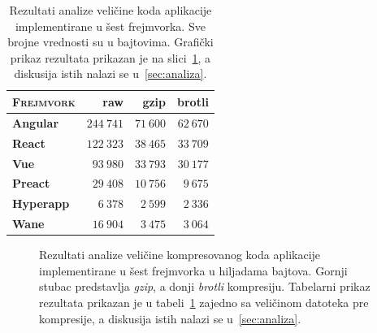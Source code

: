 \begin{table}[p]
  \centering
  \begin{tabularx}{0.66\textwidth}{Xrrr}
    \toprule 
    \textsc{Frejmvork} & {raw} & {gzip} & {brotli} \\
    \midrule
    \textbf{Angular} & $244~741$ & $71~600$ & $62~670$ \\
    \textbf{React}   & $122~323$ & $38~465$ & $33~709$ \\
    \textbf{Vue}     &  $93~980$ & $33~793$ & $30~177$ \\
    \textbf{Preact}  &  $29~408$ & $10~756$ &  $9~675$ \\ 
    \textbf{Hyperapp}&   $6~378$ &  $2~599$ &  $2~336$ \\
    \textbf{Wane}    &  $16~904$ &  $3~475$ &  $3~064$ \\
    \bottomrule
  \end{tabularx}
  \caption{Rezultati analize veličine koda aplikacije  implementirane u šest frejmvorka. Sve brojne vrednosti su u bajtovima. Grafički prikaz rezultata prikazan je na slici~\ref{fig:analiza}, a diskusija istih nalazi se u~\cref{sec:analiza}.}
  \label{tab:analiza}
\end{table}

\begin{figure}[p]
  \centering
  \begin{bchart}[step=10,max=80]
    \smallskip
    \smallskip
    \smallskip
    \smallskip
    \smallskip
  \end{bchart}
  \caption{Rezultati analize veličine kompresovanog koda aplikacije  implementirane u šest frejmvorka u hiljadama bajtova. Gornji stubac predstavlja \textsl{gzip}, a donji \textsl{brotli} kompresiju. Tabelarni prikaz rezultata prikazan je u tabeli~\ref{tab:analiza} zajedno sa veličinom datoteka pre kompresije, a diskusija istih nalazi se u~\cref{sec:analiza}.}
  \label{fig:analiza}
\end{figure}
